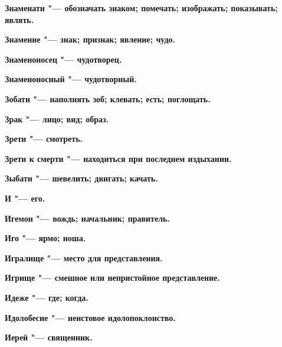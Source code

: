 \bfseries Знаменати \normalfont{} "--- обозначать знаком; помечать; изображать; показывать; являть. 




\bfseries Знамение \normalfont{} "--- знак; признак; явление; чудо. 




\bfseries Знаменоносец \normalfont{} "--- чудотворец. 




\bfseries Знаменоносный \normalfont{} "--- чудотворный. 




\bfseries Зобати \normalfont{} "--- наполнять зоб; клевать; есть; поглощать. 




\bfseries Зрак \normalfont{} "--- лицо; вид; образ. 




\bfseries Зрети \normalfont{} "--- смотреть. 




\bfseries Зрети к смерти \normalfont{} "--- находиться при последнем издыхании. 




\bfseries Зыбати \normalfont{} "--- шевелить; двигать; качать. 




 





\bfseries И \normalfont{} "--- его. 




\bfseries Игемон \normalfont{} "--- вождь; начальник; правитель. 




\bfseries Иго \normalfont{} "--- ярмо; ноша. 




\bfseries Игралище \normalfont{} "--- место для представления. 




\bfseries Игрище \normalfont{} "--- смешное или непристойное представление. 




\bfseries Идеже \normalfont{} "--- где; когда. 




\bfseries Идолобесие \normalfont{} "--- неистовое идолопоклонство. 




\bfseries Иерей \normalfont{} "--- священник. 




